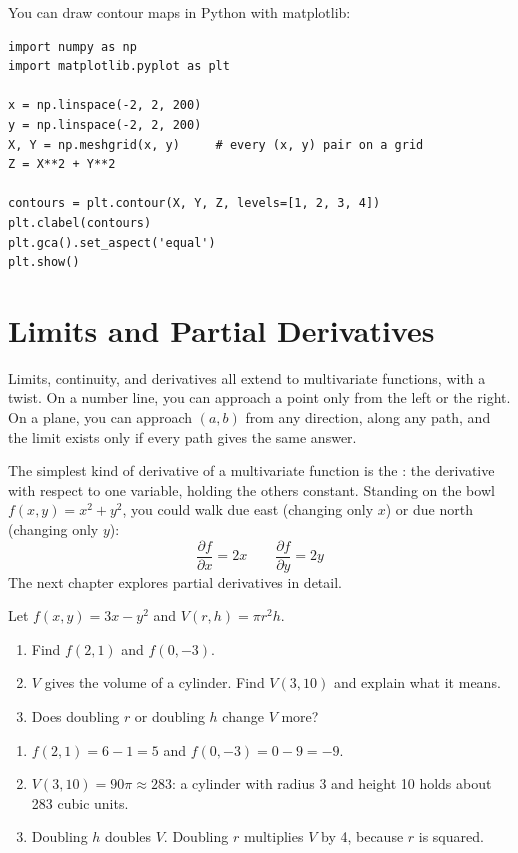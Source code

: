 You can draw contour maps in Python with matplotlib:

\begin{verbatim}
import numpy as np
import matplotlib.pyplot as plt

x = np.linspace(-2, 2, 200)
y = np.linspace(-2, 2, 200)
X, Y = np.meshgrid(x, y)     # every (x, y) pair on a grid
Z = X**2 + Y**2

contours = plt.contour(X, Y, Z, levels=[1, 2, 3, 4])
plt.clabel(contours)
plt.gca().set_aspect('equal')
plt.show()
\end{verbatim}

\section{Limits and Partial Derivatives}

Limits, continuity, and derivatives all extend
to multivariate functions, with a twist. On a number line, you can
approach a point only from the left or the right. On a plane, you can
approach $(a, b)$ from any direction, along any path, and the limit
exists only if every path gives the same answer.

The simplest kind of derivative of a multivariate function is the
: the
derivative with respect to one variable, holding the others constant.
Standing on the bowl $f(x, y) = x^2 + y^2$, you could walk due east
(changing only $x$) or due north (changing only $y$):
$$\frac{\partial f}{\partial x} = 2x \qquad \frac{\partial f}{\partial y} = 2y$$
The next chapter explores partial derivatives in detail.

\begin{Exercise}[title={Evaluating}, label=mvf_eval]
Let $f(x, y) = 3x - y^2$ and $V(r, h) = \pi r^2 h$.
\begin{enumerate}
\item Find $f(2, 1)$ and $f(0, -3)$.
\item $V$ gives the volume of a cylinder. Find $V(3, 10)$ and explain what
it means.
\item Does doubling $r$ or doubling $h$ change $V$ more?
\end{enumerate}
\end{Exercise}
\begin{Answer}[ref=mvf_eval]
\begin{enumerate}
\item $f(2, 1) = 6 - 1 = 5$ and $f(0, -3) = 0 - 9 = -9$.
\item $V(3, 10) = 90\pi \approx 283$: a cylinder with radius 3 and height
10 holds about 283 cubic units.
\item Doubling $h$ doubles $V$. Doubling $r$ multiplies $V$ by 4, because
$r$ is squared.
\end{enumerate}
\end{Answer}


